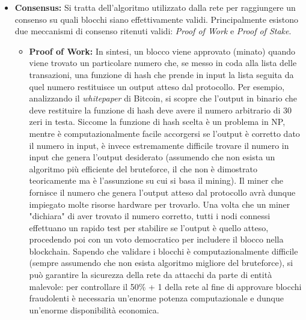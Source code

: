 \documentclass[a4paper, 12pt]{article}
\begin{document}
\begin{itemize}

\item \textbf{Consensus: }
Si tratta dell'algoritmo utilizzato dalla rete per raggiungere un consenso su quali blocchi siano effettivamente validi.
Principalmente esistono due meccanismi di consenso ritenuti validi: \textit{Proof of Work} e \textit{Proof of Stake}.

\begin{itemize}
    \item \textbf{Proof of Work: }
    In sintesi, un blocco viene approvato (minato) quando viene trovato un particolare numero che, se messo in coda alla lista delle transazioni, una funzione di hash che prende
    in input la lista seguita da quel numero restituisce un output atteso dal protocollo. Per esempio, analizzando il \textit{whitepaper} di Bitcoin, si scopre che
    l'output in binario che deve restituire la funzione di hash deve avere il numero arbitrario di 30 zeri in testa.
    Siccome la funzione di hash scelta è un problema in NP, mentre è computazionalmente facile accorgersi se l'output è corretto dato il numero in input, è invece estremamente difficile
    trovare il numero in input che genera l'output desiderato (assumendo che non esista un algoritmo più efficiente del bruteforce, il che non è dimostrato teoricamente ma è l'assunzione su cui si basa il mining). Il miner che fornisce il numero che genera l'output atteso dal protocollo
    avrà dunque impiegato molte risorse hardware per trovarlo.
    Una volta che un miner "dichiara" di aver trovato il numero corretto, tutti i nodi connessi effettuano un rapido test per stabilire se l'output è quello atteso, procedendo
    poi con un voto democratico per includere il blocco nella blockchain.
    Sapendo che validare i blocchi è computazionalmente difficile (sempre assumendo che non esista algoritmo migliore del bruteforce), si può garantire la sicurezza della rete da attacchi da parte di entità malevole: per controllare il 50\% + 1 della
    rete al fine di approvare blocchi fraudolenti è necessaria un'enorme potenza computazionale e dunque un'enorme disponibilità economica.\\


\end{itemize}
\end{itemize}
\end{document}
